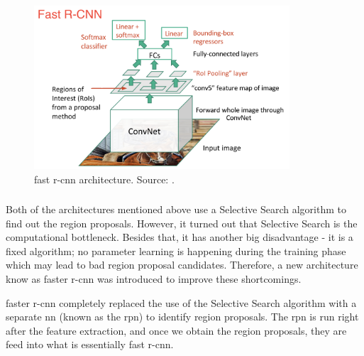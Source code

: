             \begin{figure}[ht]
                \centering
                \includegraphics[width=0.85\textwidth]{resources/fast_r_cnn_architecture.png}
                \caption{\Gls{fast r-cnn} architecture. Source: \cite{xuobjectdetection}.}
                \label{fig:fast r-cnn architecture}
            \end{figure}
    
        \subsubsection{}
            Both of the architectures mentioned above use a Selective Search algorithm to find out the region proposals. However, it turned out that Selective Search is the computational bottleneck. Besides that, it has another big disadvantage - it is a fixed algorithm; no parameter learning is happening during the training phase which may lead to bad region proposal candidates. Therefore, a new architecture know as \gls{faster r-cnn} \cite{ren2015faster} was introduced to improve these shortcomings. 
            
            \Gls{faster r-cnn} completely replaced the use of the Selective Search algorithm with a separate \gls{nn} (known as the \gls{rpn}) to identify region proposals. The \gls{rpn} is run right after the feature extraction, and once we obtain the region proposals, they are feed into what is essentially \gls{fast r-cnn}.

